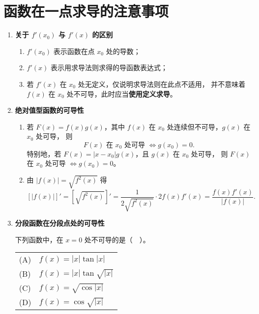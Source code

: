 \section{函数在一点求导的注意事项}
\DTwoTwo
\begin{enumerate}
    \item \textbf{关于 $f'(x_0)$ 与 $f'(x)$ 的区别}
          \begin{enumerate}
              \item $f'(x_0)$ 表示函数在点 $x_0$ 处的导数；
              \item $f'(x)$ 表示用求导法则求得的导函数表达式；
              \item 若 $f'(x)$ 在 $x_0$ 处无定义，仅说明求导法则在此点不适用，
                    并不意味着 $f(x)$ 在 $x_0$ 处不可导，此时应当\textbf{使用定义求导}。
          \end{enumerate}

    \item \textbf{绝对值型函数的可导性}
          \begin{enumerate}
              \item 若 $F(x)=f(x)g(x)$，其中 $f(x)$ 在 $x_0$ 处连续但不可导，$g(x)$ 在 $x_0$ 处可导，
                    则
                    \[
                        F(x) \text{ 在 } x_0 \text{ 处可导 } \Longleftrightarrow g(x_0)=0.
                    \]
                    特别地，若 $F(x)=|x-x_0|g(x)$，且 $g(x)$ 在 $x_0$ 处可导，
                    则 $F(x)$ 在 $x_0$ 处可导 $\Longleftrightarrow g(x_0)=0$。
              \item 由 $|f(x)| = \sqrt{f^2(x)}$ 得
                    \[
                        [|f(x)|]' = [\sqrt{f^2(x)}]'
                        = \frac{1}{2\sqrt{f^2(x)}} \cdot 2f(x)f'(x)
                        = \frac{f(x)f'(x)}{|f(x)|}.
                    \]
          \end{enumerate}

    \item \textbf{分段函数在分段点处的可导性}

          \begin{example}{}{}
              下列函数中，在 $x=0$ 处不可导的是（　）。

              \vspace{0.5em}
              \begin{tabular}{ll}
                  (A) & $f(x)=|x|\tan|x|$        \\[0.3em]
                  (B) & $f(x)=|x|\tan\sqrt{|x|}$ \\[0.3em]
                  (C) & $f(x)=\sqrt{\cos|x|}$    \\[0.3em]
                  (D) & $f(x)=\cos\sqrt{|x|}$
              \end{tabular}
          \end{example}


\end{enumerate}
